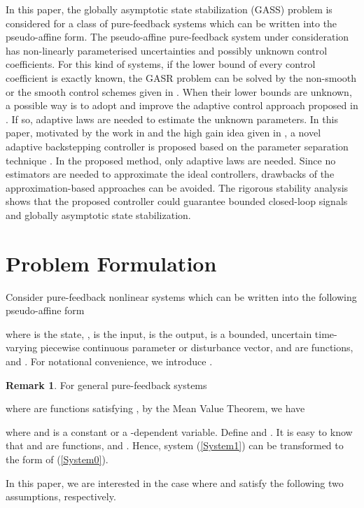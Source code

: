 \documentclass{tSYS2e}
\theoremstyle{plain}
\theoremstyle{definition}
\newtheorem{remark}{Remark}
\begin{document}
In this paper, the globally asymptotic state stabilization (GASS) problem is
considered for a class of pure-feedback systems which can be written into the pseudo-affine form.
The  pseudo-affine pure-feedback system under consideration has non-linearly parameterised uncertainties
and possibly unknown control coefficients. For this kind of systems,
if the lower bound of every control coefficient is exactly known,
the GASR problem can be solved by the non-smooth or the smooth control schemes given in \cite{Lin2002a, Lin2002b}.
When their lower bounds are unknown, a possible way is to adopt and improve the adaptive control approach proposed in \cite{Sun2007}. If so,  adaptive laws are needed to estimate the unknown parameters.
In this paper, motivated by the work in \cite{Ye1999} and the high gain idea given in \cite{Lei2006},
a novel adaptive backstepping controller is proposed based on the parameter separation technique \citep{Lin2002a,Lin2002b}.
In the proposed method, only  adaptive laws are needed. Since no estimators are needed to approximate the
ideal controllers, drawbacks of the approximation-based approaches can be avoided.
The rigorous stability analysis shows that the proposed controller could guarantee bounded closed-loop signals and globally
asymptotic state stabilization.


\section{Problem Formulation}
Consider pure-feedback nonlinear systems which can be written into the following pseudo-affine form

where  is the state, ,  is the input,  is the output,  is a
bounded, uncertain time-varying piecewise continuous parameter or disturbance vector,
 and  are
 functions, and .
For notational convenience, we introduce .

\begin{remark} { For general pure-feedback systems

where  are  functions satisfying , by the Mean Value Theorem, we
have

where  and is a constant or a -dependent variable.
Define  and .
It is easy to know that  and  are  functions, and .
Hence, system (\ref{System1}) can be transformed to the form of (\ref{System0}).}
\end{remark}

In this paper, we are interested in the case where  and  satisfy the following two assumptions, respectively.
\end{document}
